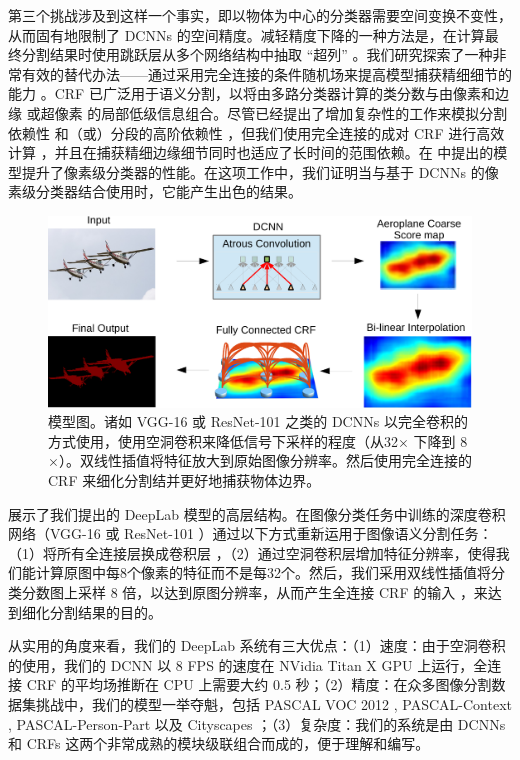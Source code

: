 第三个挑战涉及到这样一个事实，即以物体为中心的分类器需要空间变换不变性，从而固有地限制了 DCNNs 的空间精度。减轻精度下降的一种方法是，在计算最终分割结果时使用跳跃层从多个网络结构中抽取 ``超列'' \cite{hariharan2014hypercolumns, long2014fully}。我们研究探索了一种非常有效的替代办法——通过采用完全连接的条件随机场来提高模型捕获精细细节的能力 \cite{krahenbuhl2011efficient}。CRF 已广泛用于语义分割，以将由多路分类器计算的类分数与由像素和边缘 \cite{rother2004grabcut, shotton2009textonboost} 或超像素 \cite{lucchi2011spatial} 的局部低级信息组合。尽管已经提出了增加复杂性的工作来模拟分割依赖性 \cite{he2004multiscale, ladicky2009associative, lempitsky2011pylon} 和（或）分段的高阶依赖性 \cite{delong2012fast, gonfaus2010harmony, kohli2009robust, CPY13, Wang15}，但我们使用完全连接的成对 CRF 进行高效计算 \cite{krahenbuhl2011efficient}，并且在捕获精细边缘细节同时也适应了长时间的范围依赖。在 \cite{krahenbuhl2011efficient} 中提出的模型提升了像素级分类器的性能。在这项工作中，我们证明当与基于 DCNNs 的像素级分类器结合使用时，它能产生出色的结果。

\begin{figure}[!th]
  \centering
  \includegraphics[width=0.7\linewidth]{fig/model_illustration4.pdf}
  \caption{模型图。诸如 VGG-16 或 ResNet-101 之类的 DCNNs 以完全卷积的方式使用，使用空洞卷积来降低信号下采样的程度（从32$\times$ 下降到 8$\times$）。双线性插值将特征放大到原始图像分辨率。然后使用完全连接的 CRF 来细化分割结并更好地捕获物体边界。} \label{fig:ModelIllustration}
\end{figure}

 展示了我们提出的 DeepLab 模型的高层结构。在图像分类任务中训练的深度卷积网络（VGG-16 \cite{simonyan2014very} 或 ResNet-101 \cite{he2015deep}）通过以下方式重新运用于图像语义分割任务：（1）将所有全连接层换成卷积层 \cite{long2014fully}，（2）通过空洞卷积层增加特征分辨率，使得我们能计算原图中每8个像素的特征而不是每32个。然后，我们采用双线性插值将分类分数图上采样 8 倍，以达到原图分辨率，从而产生全连接 CRF 的输入 \cite{krahenbuhl2011efficient}，来达到细化分割结果的目的。

从实用的角度来看，我们的 DeepLab 系统有三大优点：（1）速度：由于空洞卷积的使用，我们的 DCNN 以 8 FPS 的速度在 NVidia Titan X GPU 上运行，全连接 CRF 的平均场推断在 CPU 上需要大约 0.5 秒；（2）精度：在众多图像分割数据集挑战中，我们的模型一举夺魁，包括 PASCAL VOC 2012 \cite{everingham2014pascal}, PASCAL-Context \cite{mottaghi2014role}, PASCAL-Person-Part \cite{chen_cvpr14} 以及 Cityscapes \cite{Cordts2016Cityscapes}；（3）复杂度：我们的系统是由 DCNNs 和 CRFs 这两个非常成熟的模块级联组合而成的，便于理解和编写。

